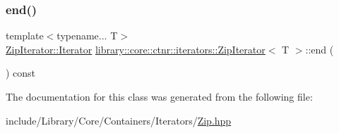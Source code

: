 \mbox{\label{classlibrary_1_1core_1_1ctnr_1_1iterators_1_1_zip_iterator_a91c3191909df9dcc737f14d9e38d9a78}} 
\subsubsection{\texorpdfstring{end()}{end()}}
{\footnotesize\ttfamily template$<$typename... T$>$ \\
\hyperlink{classlibrary_1_1core_1_1ctnr_1_1iterators_1_1_zip_iterator_1_1_iterator}{Zip\+Iterator\+::\+Iterator} \hyperlink{classlibrary_1_1core_1_1ctnr_1_1iterators_1_1_zip_iterator}{library\+::core\+::ctnr\+::iterators\+::\+Zip\+Iterator}$<$ T $>$\+::end (\begin{DoxyParamCaption}{ }\end{DoxyParamCaption}) const\hspace{0.3cm}{\ttfamily [inline]}}



The documentation for this class was generated from the following file\+:\begin{DoxyCompactItemize}
\item 
include/\+Library/\+Core/\+Containers/\+Iterators/\hyperlink{_zip_8hpp}{Zip.\+hpp}\end{DoxyCompactItemize}
